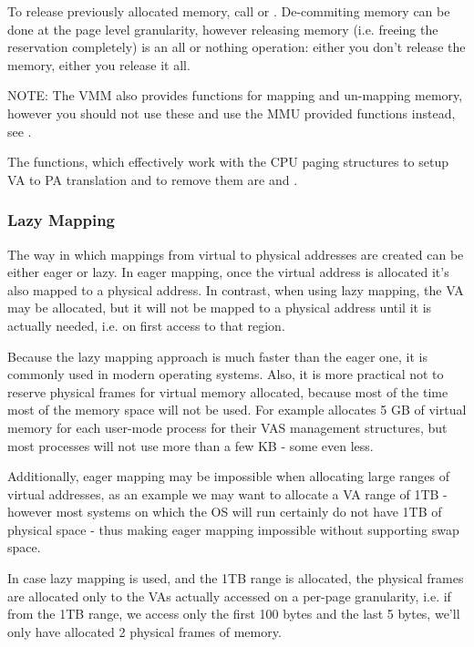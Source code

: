 \begin{appendices}
To release previously allocated memory, call  or . De-commiting
memory can be done at the page level granularity, however releasing memory (i.e. freeing the 
reservation completely) is an all or nothing operation: either you don't release the memory, either
you release it all.

NOTE: The VMM also provides functions for mapping and un-mapping memory, however you should not use
these and use the MMU provided functions instead, see .

The functions, which effectively work with the CPU paging structures to setup VA to PA translation
and to remove them are  and .

\subsubsection{Lazy Mapping}
\label{sect:LazyMapping}

The way in which mappings from virtual to physical addresses are created can be either eager or lazy.
In eager mapping, once the virtual address is allocated it's also mapped to a physical address. In
contrast, when using lazy mapping, the VA may be allocated, but it will not be mapped to a physical
address until it is actually needed, i.e. on first access to that region.

Because the lazy mapping approach is much faster than the eager one, it is commonly used in modern
operating systems. Also, it is more practical not to reserve physical frames for virtual memory
allocated, because most of the time most of the memory space will not be used. For example
\projectname allocates 5 GB of virtual memory for each user-mode process for their VAS management
structures, but most processes will not use more than a few KB - some even less.

Additionally, eager mapping may be impossible when allocating large ranges of virtual
addresses, as an example we may want to allocate a VA range of 1TB - however most systems on which
the OS will run certainly do not have 1TB of physical space - thus making eager mapping impossible
without supporting swap space.

In case lazy mapping is used, and the 1TB range is allocated, the physical frames are allocated only
to the VAs actually accessed on a per-page granularity, i.e. if from the 1TB range, we access only
the first 100 bytes and the last 5 bytes, we'll only have allocated 2 physical frames of memory.


\end{appendices}
